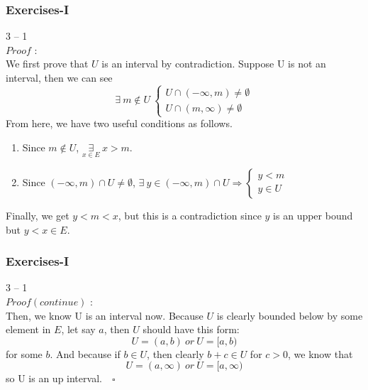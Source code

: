 \documentclass[12pt, t]{beamer}
\begin{document}
\begin{frame}
    \frametitle{Exercises-I}
    3 -- 1\\
    $Proof$ : \\
    \hspace{1em} We first prove that $U$ is an interval by contradiction. Suppose U is not an interval, then we can see
    \begin{equation*}
        \exists\ m\notin U\
        \begin{cases}
            U\cap(-\infty, m)\neq \emptyset \\
            U\cap(m,\infty)\neq \emptyset
        \end{cases}
    \end{equation*}
    \hspace{1em} From here, we have two useful conditions as follows.
    \begin{enumerate}
        \item Since $m\notin U$, $\underset{x\in E}{\exists}\ x>m $.
        \item Since $(-\infty,m)\cap U\neq \emptyset$, $\exists\ y\in (-\infty,m)\cap U\Rightarrow
                  \begin{cases}
                      y<m \\
                      y\in U
                  \end{cases}$
    \end{enumerate}
    \hspace{1em} Finally, we get $y<m<x$, but this is a contradiction since $y$ is an upper bound but $y<x\in E$.
\end{frame}

\begin{frame}
    \frametitle{Exercises-I}
    3 -- 1\\
    $Proof(continue)$ : \\
    \hspace{1em} Then, we know U is an interval now. Because $U$ is clearly bounded below by some element in $E$, let say $a$, then
    $U$ should have this form:
    \begin{equation*}
        U=(a,b)\ or\ U=[a,b)
    \end{equation*}
    for some $b$. And because if $b\in U$, then clearly $b+c\in U$ for $c>0$, we know that
    \begin{equation*}
        U=(a,\infty)\ or\ U=[a,\infty)
    \end{equation*}
    so U is an up interval.$\quad \square$

\end{frame}
\end{document}
